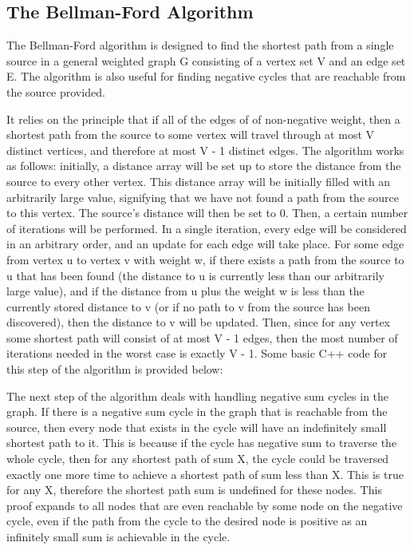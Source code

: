 \documentclass[conference]{IEEEtran}
\begin{document}
\subsection{The Bellman-Ford Algorithm}\label{AA}

The Bellman-Ford algorithm is designed to find the shortest path from a single source in a general weighted graph G consisting of a vertex set V and an edge set E. The algorithm is also useful for finding negative cycles that are reachable from the source provided.

It relies on the principle that if all of the edges of of non-negative weight, then a shortest path from the source to some vertex will travel through at most V distinct vertices, and therefore at most V - 1 distinct edges. The algorithm works as follows: initially, a distance array will be set up to store the distance from the source to every other vertex. This distance array will be initially filled with an arbitrarily large value, signifying that we have not found a path from the source to this vertex. The source's distance will then be set to 0. Then, a certain number of iterations will be performed. In a single iteration, every edge will be considered in an arbitrary order, and an update for each edge will take place. For some edge from vertex u to vertex v with weight w, if there exists a path from the source to u that has been found (the distance to u is currently less than our arbitrarily large value), and if the distance from u plus the weight w is less than the currently stored distance to v (or if no path to v from the source has been discovered), then the distance to v will be updated. Then, since for any vertex some shortest path will consist of at most V - 1 edges, then the most number of iterations needed in the worst case is exactly V - 1. Some basic C++ code for this step of the algorithm is provided below:



The next step of the algorithm deals with handling negative sum cycles in the graph. If there is a negative sum cycle in the graph that is reachable from the source, then every node that exists in the cycle will have an indefinitely small shortest path to it. This is because if the cycle has negative sum to traverse the whole cycle, then for any shortest path of sum X, the cycle could be traversed exactly one more time to achieve a shortest path of sum less than X. This is true for any X, therefore the shortest path sum is undefined for these nodes. This proof expands to all nodes that are even reachable by some node on the negative cycle, even if the path from the cycle to the desired node is positive as an infinitely small sum is achievable in the cycle.
\end{document}
